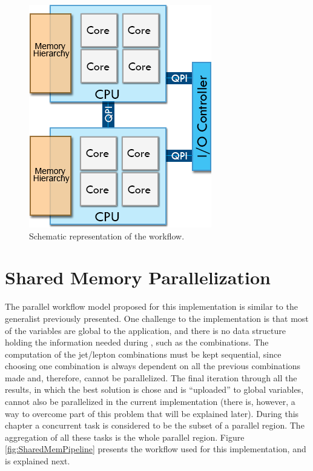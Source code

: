 \begin{figure}[!htp]
	\begin{center}
		\includegraphics[scale=0.5]{../../common/img/numa_qpi.png}
		\caption{Schematic representation of the \ttDilepKinFit workflow.}
		\label{fig:ParallelPipeline}
	\end{center}
\end{figure}

\section{Shared Memory Parallelization}
\label{Parallelization:SharedMem}

The parallel workflow model proposed for this implementation is similar to the generalist previously presented. One challenge to the implementation is that most of the variables are global to the application, and there is no data structure holding the information needed during \ttDilepKinFit, such as the combinations. The computation of the jet/lepton combinations must be kept sequential, since choosing one combination is always dependent on all the previous combinations made and, therefore, cannot be parallelized. The final iteration through all the results, in which the best solution is chose and is ``uploaded'' to global variables, cannot also be parallelized in the current implementation (there is, however, a way to overcome part of this problem that will be explained later). During this chapter a concurrent task is considered to be the subset of a parallel region. The aggregation of all these tasks is the whole parallel region. Figure \ref{fig:SharedMemPipeline} presents the workflow used for this implementation, and is explained next.


